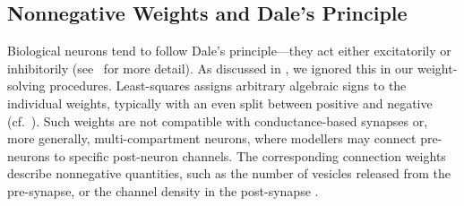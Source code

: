 
\subsection{Nonnegative Weights and Dale's Principle}
\label{sec:nef_nonneg}

Biological neurons tend to follow Dale's principle---they act either excitatorily or inhibitorily (see~ for more detail).
As discussed in , we ignored this in our weight-solving procedures.
Least-squares assigns arbitrary algebraic signs to the individual weights, typically with an even split between positive and negative (cf.~).
Such weights are not compatible with conductance-based synapses or, more generally, multi-compartment neurons, where modellers may connect pre-neurons to specific post-neuron channels.
The corresponding connection weights describe nonnegative quantities, such as the number of vesicles released from the pre-synapse, or the channel density in the post-synapse \citep{roth2009modeling}.

